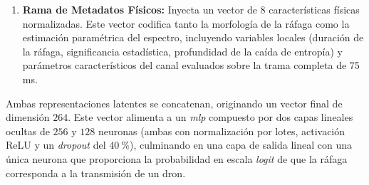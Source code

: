 \begin{enumerate}
    \item \textbf{Rama de Metadatos Físicos:}
    Inyecta un vector de $8$ características físicas normalizadas. Este vector codifica tanto la morfología de la ráfaga como la estimación paramétrica del espectro, incluyendo variables locales (duración de la ráfaga, significancia estadística, profundidad de la caída de entropía) y parámetros característicos del canal evaluados sobre la trama completa de 75\,ms.
\end{enumerate}

Ambas representaciones latentes se concatenan, originando un vector final de dimensión $264$. Este vector alimenta a un \textit{\gls{mlp}} compuesto por dos capas lineales ocultas de $256$ y $128$ neuronas (ambas con normalización por lotes, activación ReLU y un \textit{dropout} del $40~\%$), culminando en una capa de salida lineal con una única neurona que proporciona la probabilidad en escala \textit{logit} de que la ráfaga corresponda a la transmisión de un dron.

